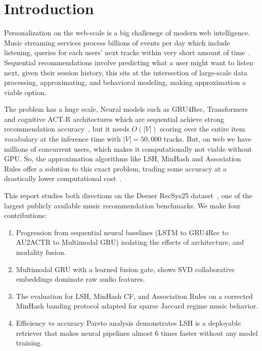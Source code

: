 \documentclass[conference]{IEEEtran}
\begin{document}
\section{Introduction}

Personalization on the web-scale is a big challenege of modern web
intelligence. Music streaming services process billions of events per day which
include listening, queries for each users' next tracks within very short amount
of time~\cite{schedl2018,hansen2020}. Sequential recommendations involve
predicting what a user might want to listen next, given their session history,
this sits at the intersection of large-scale data processing, approximating,
and behavioral modeling, making approximation a viable option.

The problem has a huge scale, Neural models such as GRU4Rec, Transformers and
cognitive ACT-R architectures which are sequential achieve strong
recommendation accuracy~\cite{tran2025reacta,tran2024pisa,vaswani2017}, but it
needs $O(|V|)$ scoring over the entire item vocabulary at the inference time
with $|V| = 50{,}000$ tracks. But, on web we have millions of concurrent users,
which makes it computationally not viable without GPU. So, the approximation
algorithms like LSH, MinHash and Association Rules offer a solution to this
exact problem, trading some accuracy at a drastically lower computational
cost~\cite{datar2004,broder1997,agrawal1994}.

This report studies both directions on the Deezer RecSys25
dataset~\cite{tran2025reacta}, one of the largest publicly available music
recommendation benchmarks. We make four contributions:

\begin{enumerate}
\item Progression from sequential neural baselines (LSTM to GRU4Rec to
      AU2ACTR to Multimodal GRU) isolating the effects of architecture,
      and modality fusion.
\item Multimodal GRU with a learned fusion gate, shows SVD collaborative
      embeddings dominate raw audio features.
\item The evaluation for LSH, MinHash CF, and Association Rules on a
      corrected MinHash banding protocol adapted for sparse Jaccard regime
      music behavior.
\item Efficiency vs accuracy Pareto analysis demonstrates LSH is a deployable
      retriever that makes neural pipelines almost 6 times faster without any
      model training.
\end{enumerate}
\end{document}
